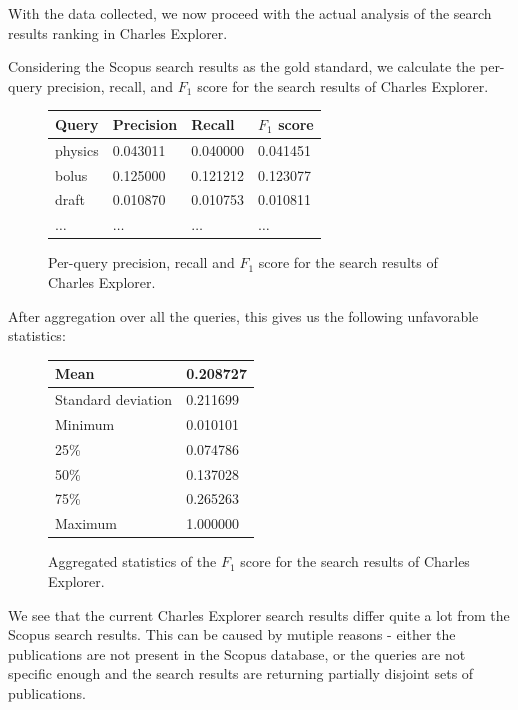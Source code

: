 With the data collected, we now proceed with the actual analysis of the search results ranking in Charles Explorer.

Considering the Scopus search results as the gold standard, we calculate the per-query precision, recall, and $F_1$ score for the search results of Charles Explorer.

\begin{figure}[!ht]
    \captionsetup{width=.9\linewidth}
    \centering
    \begin{tabular}{|l|l|l|l|}
    \hline
        \textbf{Query} & \textbf{Precision} & \textbf{Recall} & \textbf{$F_1$ score} \\ \hline
        physics & 0.043011 & 0.040000 & 0.041451 \\ \hline
        bolus & 0.125000 & 0.121212 & 0.123077 \\ \hline
        draft & 0.010870 & 0.010753 & 0.010811 \\ \hline
        $\hdots$ & $\hdots$ & $\hdots$ & $\hdots$ \\ \hline
    \end{tabular}
    \caption{Per-query precision, recall and $F_1$ score for the search results of Charles Explorer.}
\end{figure}

After aggregation over all the queries, this gives us the following unfavorable statistics:

\begin{figure}[!ht]
    \captionsetup{width=.9\linewidth}
    \centering
    \begin{tabular}{|l|l|}
    \hline
        Mean & 0.208727 \\ \hline
        Standard deviation & 0.211699 \\ \hline
        Minimum & 0.010101 \\ \hline
        25\% & 0.074786 \\ \hline
        50\% & 0.137028 \\ \hline
        75\% & 0.265263 \\ \hline
        Maximum & 1.000000 \\ \hline
    \end{tabular}
    \caption{Aggregated statistics of the $F_1$ score for the search results of Charles Explorer.}
\end{figure}

We see that the current Charles Explorer search results differ quite a lot from the Scopus search results. 
This can be caused by mutiple reasons - either the publications are not present in the Scopus database, or the queries are not specific enough and the search results are returning partially disjoint sets of publications.

